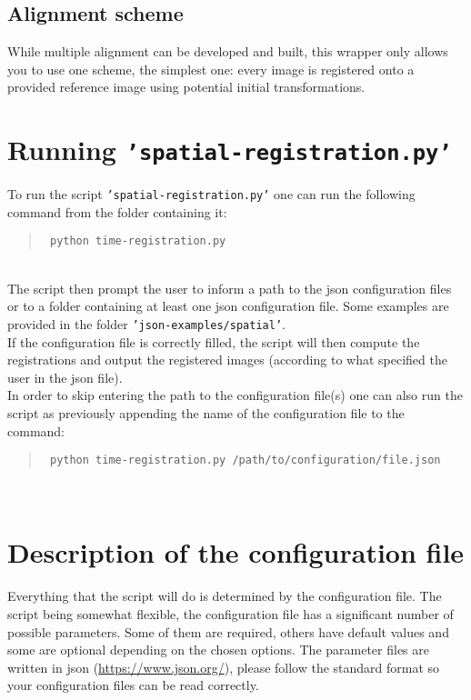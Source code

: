\documentclass[10pt,a4paper]{book}
\newcommand{\option}[1]{{\texttt{'#1'}}}
\newenvironment{code}[1]{\mbox{}\\[1ex]\hspace*{-#1cm}\begin{minipage}{150mm}\begin{quote}\tt}{\end{quote}\end{minipage}\mbox{}\\[1ex]}
\begin{document}
\subsection{Alignment scheme}
While multiple alignment can be developed and built, this wrapper only allows you to use one scheme, the simplest one: every image is registered onto a provided reference image using potential initial transformations.
\section{Running \option{spatial-registration.py}}
To run the script \option{spatial-registration.py} one can run the following command from the folder containing it:
\begin{code}{0.8}
\$ python time-registration.py
\end{code}
The script then prompt the user to inform a path to the json configuration files or to a folder containing at least one json configuration file. Some examples are provided in the folder \option{json-examples/spatial}.\\
If the configuration file is correctly filled, the script will then compute the registrations and output the registered images (according to what specified the user in the json file).\\
In order to skip entering the path to the configuration file(s) one can also run the script as previously appending the name of the configuration file to the command:
\begin{code}{0.8}
\$ python time-registration.py /path/to/configuration/file.json
\end{code}
\section{Description of the configuration file}
\paragraph{}Everything that the script will do is determined by the configuration file. The script being somewhat flexible, the configuration file has a significant number of possible parameters. Some of them are required, others have default values and some are optional depending on the chosen options. The parameter files are written in json (\url{https://www.json.org/}), please follow the standard format so your configuration files can be read correctly.
\end{document}
